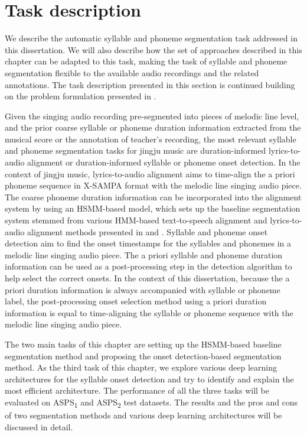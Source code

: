\section{Task description}\label{sec:ch5:description}

We describe the automatic syllable and phoneme segmentation task addressed in this dissertation. We will also describe how the set of approaches described in this chapter can be adapted to this task, making the task of syllable and phoneme segmentation flexible to the available audio recordings and the related annotations. The task description presented in this section is continued building on the problem formulation presented in . 

Given the singing audio recording pre-segmented into pieces of melodic line level, and the prior coarse syllable or phoneme duration information extracted from the musical score or the annotation of teacher's recording, the most relevant syllable and phoneme segmentation tasks for jingju music are duration-informed lyrics-to-audio alignment or duration-informed syllable or phoneme onset detection. In the context of jingju music, lyrics-to-audio alignment aims to time-align the a priori phoneme sequence in \gls{X-SAMPA} format with the melodic line singing audio piece. The coarse phoneme duration information can be incorporated into the alignment system by using an \gls{HSMM}-based model, which sets up the baseline segmentation system stemmed from various \gls{HMM}-based text-to-speech alignment and lyrics-to-audio alignment methods presented in  and . Syllable and phoneme onset detection aim to find the onset timestamps for the syllables and phonemes in a melodic line singing audio piece. The a priori syllable and phoneme duration information can be used as a post-processing step in the detection algorithm to help select the correct onsets. In the context of this dissertation, because the a priori duration information is always accompanied with syllable or phoneme label, the post-processing onset selection method using a priori duration information is equal to time-aligning the syllable or phoneme sequence with the melodic line singing audio piece. 

The two main tasks of this chapter are setting up the \gls{HSMM}-based baseline segmentation method and proposing the onset detection-based segmentation method. As the third task of this chapter, we explore various deep learning architectures for the syllable onset detection and try to identify and explain the most efficient architecture. The performance of all the three tasks will be evaluated on \gls{ASPS}\textsubscript{1} and \gls{ASPS}\textsubscript{2} test datasets. The results and the pros and cons of two segmentation methods and various deep learning architectures will be discussed in detail.

